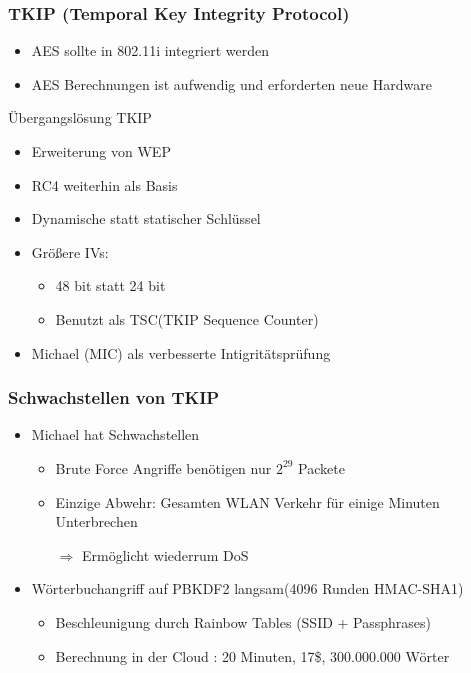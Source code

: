 \documentclass{beamer}
\begin{document}
\begin{frame}
\frametitle{TKIP (Temporal Key Integrity Protocol)}
\begin{itemize}
	\item AES sollte in 802.11i integriert werden
	\item AES Berechnungen ist aufwendig und erforderten neue Hardware
\end{itemize}
\begin{block}{Übergangslösung TKIP}
	\begin{itemize}
		\item Erweiterung von WEP
		\item RC4 weiterhin als Basis
		\item Dynamische statt statischer Schlüssel
		\item Größere IVs:
		\begin{itemize}
			\item 48 bit statt 24 bit
			\item Benutzt als TSC(TKIP Sequence Counter)
		\end{itemize}
		\item Michael (MIC) als verbesserte Intigritätsprüfung
	\end{itemize}
\end{block}
\end{frame}

\begin{frame}
\frametitle{Schwachstellen von TKIP}
\begin{itemize}
	\item Michael hat Schwachstellen
	\begin{itemize}
		\item Brute Force Angriffe benötigen nur $2^{29}$ Packete
		\item Einzige Abwehr: Gesamten WLAN Verkehr für einige Minuten Unterbrechen
		\item[$\Rightarrow$] Ermöglicht wiederrum DoS
	\end{itemize}
	\item Wörterbuchangriff auf PBKDF2 langsam(4096 Runden HMAC-SHA1)
	\begin{itemize}
		\item Beschleunigung durch Rainbow Tables \cite{renderlab} (SSID + Passphrases)
		\item Berechnung in der Cloud \cite{cloudcracker}: 20 Minuten, 17\$, 300.000.000 Wörter
	\end{itemize}
\end{itemize}
\end{frame}
\end{document}
